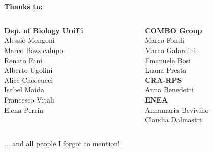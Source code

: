 \documentclass[10pt]{beamer}
\begin{document}

\section*{}
\begin{frame}
	\vspace{2mm}
	{\huge\textbf{Thanks to:}}
	\vspace{3mm}
	\begin{columns}[T]
		\begin{column}{0.5\textwidth}
			{\large\textbf{Dep. of Biology UniFi}}\\
			Alessio Mengoni\\
			Marco Bazzicalupo\\
			Renato Fani\\
			Alberto Ugolini\\
			Alice Checcucci\\
			Isabel Maida\\			
			Francesco Vitali	\\
			Elena Perrin\\	
		\end{column}
		\begin{column}{0.5\textwidth}
			{\large\textbf{COMBO Group}}\\
			Marco Fondi\\
			Marco Galardini\\
			Emanuele Bosi\\
			Luana Presta\\	
			\vspace{2mm}
			{\large\textbf{CRA-RPS}}\\
			Anna Benedetti\\
			\vspace{2mm}
			{\large\textbf{ENEA}}\\
			Annamaria Bevivino\\
			Claudia Dalmastri\\
		\end{column}
	\end{columns}
	\vspace{8mm}
	\let\thefootnote\relax\large{... and all people I forgot to mention!}
\end{frame}
\end{document}
